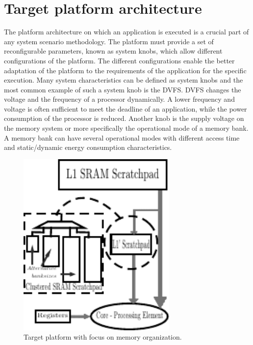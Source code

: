 \section{Target platform architecture}

The platform architecture on which an application is executed is a crucial part of any system scenario methodology.
The platform must provide a set of reconfigurable parameters, known as system knobs, which allow different configurations of the platform.
The different configurations enable the better adaptation of the platform to the requirements of the application for the specific execution.
Many system characteristics can be defined as system knobs and the most common example of such a system knob is the DVFS.
DVFS changes the voltage and the frequency of a processor dynamically.
A lower frequency and voltage is often sufficient to meet the deadline of an application, while the power consumption of the processor is reduced.
Another knob is the supply voltage on the memory system or more specifically the operational mode of a memory bank.
A memory bank can have several operational modes with different access time and static/dynamic energy consumption characteristics.

\begin{figure}
	\centering
	\includegraphics[width=0.7\textwidth]{Images/platform.pdf}
	\caption{Target platform with focus on memory organization. }
	\label{fig:pltfrm}
\end{figure}

